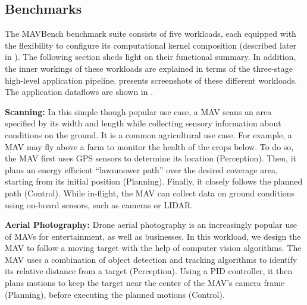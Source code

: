 \subsection{Benchmarks} \label{sec:benchmarks}
The MAVBench benchmark suite consists of five workloads, each equipped with the flexibility to configure its computational kernel composition (described later in ).
The following section sheds light on their functional summary. In addition, the inner workings of these workloads are explained in terms of the three-stage high-level application pipeline.  presents screenshots of these different workloads. The application dataflows are shown in .

\textbf{Scanning:} In this simple though popular use case, a MAV scans an area specified by its width and length while collecting sensory information about conditions on the ground. It is a common agricultural use case. For example, a MAV may fly above a farm to monitor the health of the crops below. To do so, the MAV first uses GPS sensors to determine its location (Perception). Then, it plans an energy efficient ``lawnmower path'' over the desired coverage area, starting from its initial position (Planning). Finally, it closely follows the planned path (Control). While in-flight, the MAV can collect data on ground conditions using on-board sensors, such as cameras or LIDAR. 



\textbf{Aerial Photography:} Drone aerial photography is an increasingly popular use of MAVs for entertainment, as well as businesses. In this workload, we design the MAV to follow a moving target with the help of computer vision algorithms. The MAV uses a combination of object detection and tracking algorithms to identify its relative distance from a target (Perception). Using a PID controller, it then plans motions to keep the target near the center of the MAV's camera frame (Planning), before executing the planned motions (Control).

